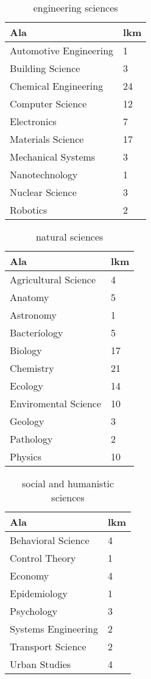 \documentclass[utf8]{gradu3}
\begin{document}
\begin{table}[htbp]
\centering
\begin{tabular}{ll}
\toprule
\textbf{Ala} & \textbf{lkm} \\
\midrule
Automotive Engineering & 1 \\
Building Science & 3 \\
Chemical Engineering & 24 \\
Computer Science & 12 \\
Electronics & 7 \\
Materials Science & 17 \\
Mechanical Systems & 3 \\
Nanotechnology & 1 \\
Nuclear Science & 3 \\
Robotics & 2 \\
\bottomrule
\end{tabular}
\caption{engineering sciences}
\label{table:engineering}
\end{table}


\begin{table}[htbp]
\centering
\begin{tabular}{ll}
\toprule
\textbf{Ala} & \textbf{lkm} \\
\midrule
Agricultural Science & 4 \\
Anatomy & 5 \\
Astronomy & 1 \\
Bacteríology & 5 \\
Biology & 17 \\
Chemistry & 21 \\
Ecology & 14 \\
Enviromental Science & 10 \\
Geology & 3 \\
Pathology & 2 \\
Physics & 10 \\
\bottomrule
\end{tabular}
\caption{natural sciences}
\label{table:naturalscience}
\end{table}


\begin{table}[htbp]
\centering
\begin{tabular}{ll}
\toprule
\textbf{Ala} & \textbf{lkm} \\
\midrule
Behavioral Science & 4 \\
Control Theory & 1\\
Economy & 4 \\
Epidemiology & 1 \\
Psychology & 3 \\
Systems Engineering & 2 \\
Transport Science & 2 \\
Urban Studies & 4 \\
\bottomrule
\end{tabular}
\caption{social and humanistic sciences}
\label{table:socialscience}
\end{table}
\end{document}
